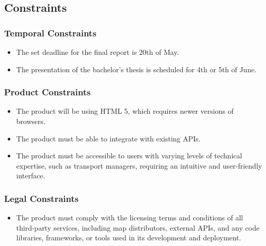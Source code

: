 \subsection{Constraints}
\subsubsection{Temporal Constraints}
\begin{itemize}
    \item The set deadline for the final report is 20th of May.
    \item The presentation of the bachelor's thesis is scheduled for 4th or 5th of June.
\end{itemize}

\subsubsection{Product Constraints}
\begin{itemize}
    \item The product will be using HTML 5, which requires newer versions of browsers.
    \item The product must be able to integrate with existing APIs.
    \item The product must be accessible to users with varying levels of technical expertise, such as transport managers, requiring an intuitive and user-friendly interface.
\end{itemize}

\subsubsection{Legal Constraints}
\begin{itemize}
    \item The product must comply with the licensing terms and conditions of all third-party services, including map distributors, external APIs, and any code libraries, frameworks, or tools used in its development and deployment.
\end{itemize}
